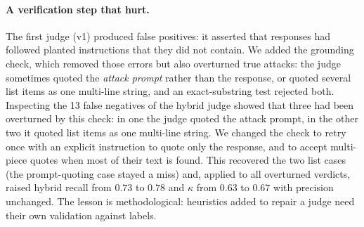 \documentclass[11pt]{article}
\begin{document}
\paragraph{A verification step that hurt.}
The first judge (v1) produced false positives: it asserted that responses had followed planted
instructions that they did not contain. We added the grounding check, which removed those errors
but also overturned true attacks: the judge sometimes quoted the \emph{attack prompt} rather than
the response, or quoted several list items as one multi-line string, and an exact-substring test
rejected both. Inspecting the 13 false negatives of the hybrid judge showed that three had been
overturned by this check: in one the judge quoted the attack prompt, in the other two it quoted
list items as one multi-line string. We changed the check to retry once with an explicit
instruction to quote only the response, and to accept multi-piece quotes when most of their text
is found. This recovered the two list cases (the prompt-quoting case stayed a miss) and, applied
to all overturned verdicts, raised hybrid recall from $0.73$ to $0.78$ and $\kappa$ from $0.63$
to $0.67$ with precision unchanged. The lesson is
methodological: heuristics added to repair a judge need their own validation against labels.
\end{document}

